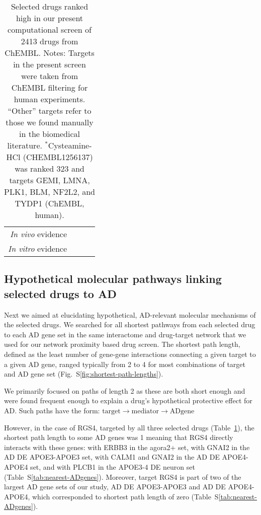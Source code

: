 \documentclass[letterpaper]{article}
\begin{document}
\begin{table}
\begin{tabular}{r|c|c|c}
               \emph{In vivo} evidence & \cite{DeMiranda2013,DeMiranda2014} &       \cite{Keene2002} &                \cite{Cicchetti2019} \\
               \emph{In vitro} evidence &      \cite{Lee2019,Rzemieniec2019} &                        &          \cite{Besouw2013,Paul2019} \\
\bottomrule
\end{tabular}
\caption{
Selected drugs ranked high in our present computational screen of 2413 drugs
from ChEMBL.  Notes: Targets in the present screen were taken from ChEMBL filtering for human
experiments. ``Other'' targets refer to those we found manually in the
biomedical literature. $^\ast$Cysteamine-HCl (CHEMBL1256137) was ranked 323
and targets GEMI, LMNA, PLK1, BLM, NF2L2, and TYDP1 (ChEMBL, human).
}
\label{tab:selected-drugs}
\end{table}

\subsection{Hypothetical molecular pathways linking selected drugs to AD}

Next we aimed at elucidating hypothetical, AD-relevant molecular mechanisms of
the selected drugs.  We searched for all shortest pathways from each selected
drug to each AD gene set in the same interactome and drug-target network that
we used for our network proximity based drug screen.  The shortest path
length, defined as the least number of gene-gene interactions connecting a
given target to a given AD gene, ranged typically from 2 to 4 for most
combinations of target and AD gene set
(Fig.~S\ref{fig:shortest-path-lengths}).

We primarily focused on paths of length 2 as these are both short enough and were found
frequent enough to explain a drug's hypothetical protective effect for AD.
Such paths have the form: $\mathrm{target} \rightarrow \mathrm{mediator}
\rightarrow \mathrm{AD gene}$

However, in the case of RGS4,
targeted by all three selected drugs (Table~\ref{tab:selected-drugs}), the
shortest path length to some AD genes was 1 meaning that RGS4 directly
interacts with these genes: with ERBB3 in the agora2+ set, with GNAI2 in the
AD DE APOE3-APOE3 set, with CALM1 and GNAI2 in the AD DE APOE4-APOE4 set, and
with PLCB1 in the APOE3-4 DE neuron set (Table~S\ref{tab:nearest-ADgenes}).
Moreover, target RGS4 is part of two of the largest AD gene sets of our study,
AD DE APOE3-APOE3 and AD DE APOE4-APOE4, which corresponded to shortest path
length of zero (Table~S\ref{tab:nearest-ADgenes}).
\end{document}
